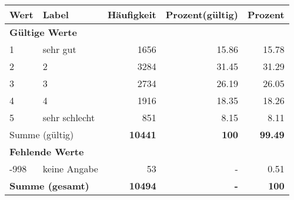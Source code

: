      \begin{longtable}{lXrrr}
     \toprule
     \textbf{Wert} & \textbf{Label} & \textbf{Häufigkeit} & \textbf{Prozent(gültig)} & \textbf{Prozent} \\
     \endhead
     \midrule
     \multicolumn{5}{l}{\textbf{Gültige Werte}}\\

     1 &
     \multicolumn{1}{X}{ sehr gut   } &


       \num{1656} &
       \num[round-mode=places,round-precision=2]{15.86} &
         \num[round-mode=places,round-precision=2]{15.78} \\

     2 &
     \multicolumn{1}{X}{ 2   } &


       \num{3284} &
       \num[round-mode=places,round-precision=2]{31.45} &
         \num[round-mode=places,round-precision=2]{31.29} \\

     3 &
     \multicolumn{1}{X}{ 3   } &


       \num{2734} &
       \num[round-mode=places,round-precision=2]{26.19} &
         \num[round-mode=places,round-precision=2]{26.05} \\

     4 &
     \multicolumn{1}{X}{ 4   } &


       \num{1916} &
       \num[round-mode=places,round-precision=2]{18.35} &
         \num[round-mode=places,round-precision=2]{18.26} \\

     5 &
     \multicolumn{1}{X}{ sehr schlecht   } &


       \num{851} &
       \num[round-mode=places,round-precision=2]{8.15} &
         \num[round-mode=places,round-precision=2]{8.11} \\
     \midrule
     \multicolumn{2}{l}{Summe (gültig)} &
       \textbf{\num{10441}} &
     \textbf{\num{100}} &
       \textbf{\num[round-mode=places,round-precision=2]{99.49}} \\
     \multicolumn{5}{l}{\textbf{Fehlende Werte}}\\
       -998 &
       keine Angabe &
         \num{53} &
        - &
         \num[round-mode=places,round-precision=2]{0.51} \\
     \midrule
     \multicolumn{2}{l}{\textbf{Summe (gesamt)}} &
          \textbf{\num{10494}} &
        \textbf{-} &
        \textbf{\num{100}} \\
     \bottomrule
     \end{longtable}
     

